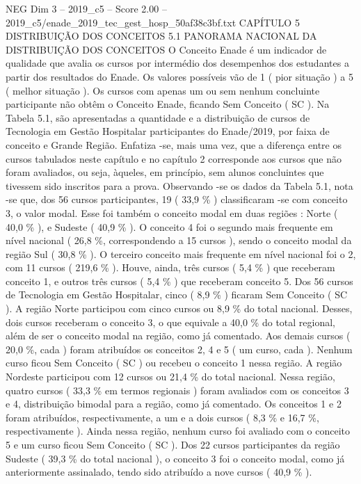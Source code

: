 \begin{textsample}{NEG Dim 3 – 2019\_c5 – Score 2.00 – 2019\_c5/enade\_2019\_tec\_gest\_hosp\_50af38c3bf.txt}  \label{ex:f3_neg_193}
CAPÍTULO 5 DISTRIBUIÇÃO DOS CONCEITOS 5.1 PANORAMA NACIONAL DA DISTRIBUIÇÃO DOS CONCEITOS O Conceito Enade é um indicador de qualidade que avalia os cursos por intermédio dos desempenhos dos estudantes a partir dos resultados do Enade.
Os valores possíveis vão de 1 ( pior situação ) a 5 ( melhor situação ).
Os cursos com apenas um ou sem nenhum concluinte participante não obtêm o Conceito Enade, ficando Sem Conceito ( SC ).
Na Tabela 5.1, são apresentadas a quantidade e a distribuição de cursos de Tecnologia em Gestão Hospitalar participantes do Enade/2019, por faixa de conceito e Grande Região.
Enfatiza -se, mais uma vez, que a diferença entre os cursos tabulados neste capítulo e no capítulo 2 corresponde aos cursos que não foram avaliados, ou seja, àqueles, em princípio, sem alunos concluintes que tivessem sido inscritos para a prova.
Observando -se os dados da Tabela 5.1, nota -se que, dos 56 cursos participantes, 19 ( 33,9 \% ) classificaram -se com conceito 3, o valor modal.
Esse foi também o conceito modal em duas regiões : Norte ( 40,0 \% ), e Sudeste ( 40,9 \% ).
O conceito 4 foi o segundo mais frequente em nível nacional ( 26,8 \%, correspondendo a 15 cursos ), sendo o conceito modal da região Sul ( 30,8 \% ).
O terceiro conceito mais frequente em nível nacional foi o 2, com 11 cursos ( 219,6 \% ).
Houve, ainda, três cursos ( 5,4 \% ) que receberam conceito 1, e outros três cursos ( 5,4 \% ) que receberam conceito 5.
Dos 56 cursos de Tecnologia em Gestão Hospitalar, cinco ( 8,9 \% ) ficaram Sem Conceito ( SC ).
A região Norte participou com cinco cursos ou 8,9 \% do total nacional.
Desses, dois cursos receberam o conceito 3, o que equivale a 40,0 \% do total regional, além de ser o conceito modal na região, como já comentado.
Aos demais cursos ( 20,0 \%, cada ) foram atribuídos os conceitos 2, 4 e 5 ( um curso, cada ).
Nenhum curso ficou Sem Conceito ( SC ) ou recebeu o conceito 1 nessa região.
A região Nordeste participou com 12 cursos ou 21,4 \% do total nacional.
Nessa região, quatro cursos ( 33,3 \% em termos regionais ) foram avaliados com os conceitos 3 e 4, distribuição bimodal para a região, como já comentado.
Os conceitos 1 e 2 foram atribuídos, respectivamente, a um e a dois cursos ( 8,3 \% e 16,7 \%, respectivamente ).
Ainda nessa região, nenhum curso foi avaliado com o conceito 5 e um curso ficou Sem Conceito ( SC ).
Dos 22 cursos participantes da região Sudeste ( 39,3 \% do total nacional ), o conceito 3 foi o conceito modal, como já anteriormente assinalado, tendo sido atribuído a nove cursos ( 40,9 \% ).

\end{textsample}
